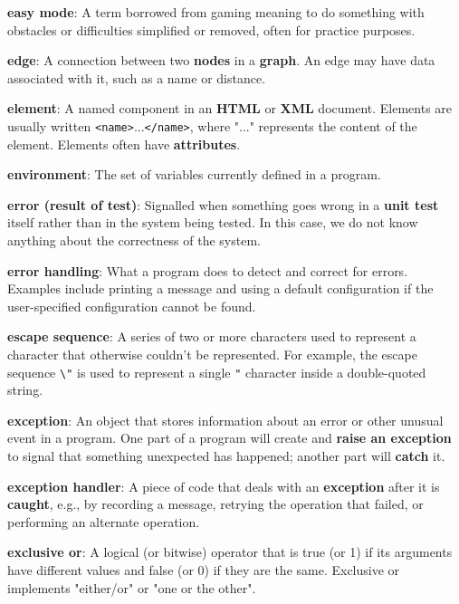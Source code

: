 \documentclass{scrbook}
\newcommand{\glosskey}[1]{\textbf{#1}}
\begin{document}
\noindent \textbf{\glosskey{easy mode}}: 
A term borrowed from gaming meaning to do something with obstacles or difficulties simplified or removed, often for practice purposes.


\noindent \textbf{\glosskey{edge}}: 
A connection between two \glosskey{nodes} in a \glosskey{graph}. An edge may have data associated with it, such as a name or distance.


\noindent \textbf{\glosskey{element}}: 
A named component in an \glosskey{HTML} or \glosskey{XML} document. Elements are usually written \texttt{<name>}...\texttt{</name>}, where "..." represents the content of the element. Elements often have \glosskey{attributes}.


\noindent \textbf{\glosskey{environment}}: 
The set of variables currently defined in a program.


\noindent \textbf{\glosskey{error (result of test)}}: 
Signalled when something goes wrong in a \glosskey{unit test} itself rather than in the system being tested. In this case, we do not know anything about the correctness of the system.


\noindent \textbf{\glosskey{error handling}}: 
What a program does to detect and correct for errors. Examples include printing a message and using a default configuration if the user-specified configuration cannot be found.


\noindent \textbf{\glosskey{escape sequence}}: 
A series of two or more characters used to represent a character that otherwise couldn't be represented. For example, the escape sequence \texttt{{\textbackslash}"} is used to represent a single \texttt{"} character inside a double-quoted string.


\noindent \textbf{\glosskey{exception}}: 
An object that stores information about an error or other unusual event in a program. One part of a program will create and \glosskey{raise an exception} to signal that something unexpected has happened; another part will \glosskey{catch} it.


\noindent \textbf{\glosskey{exception handler}}: 
A piece of code that deals with an \glosskey{exception} after it is \glosskey{caught}, e.g., by recording a message, retrying the operation that failed, or performing an alternate operation.


\noindent \textbf{\glosskey{exclusive or}}: 
A logical (or bitwise) operator that is true (or 1) if its arguments have different values and false (or 0) if they are the same. Exclusive or implements "either/or" or "one or the other".
\end{document}
